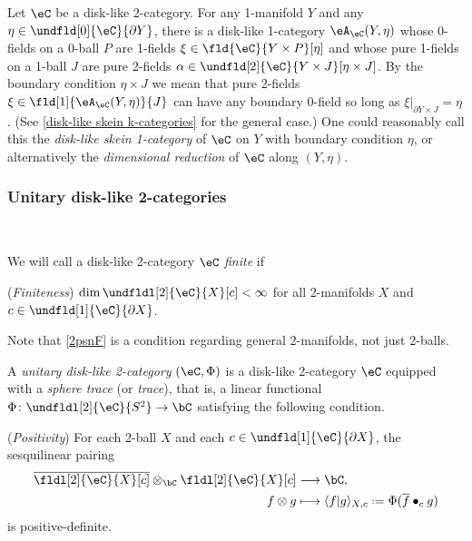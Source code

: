 \documentclass[12pt,reqno]{amsart}
\newcounter{alpha}\renewcommand\thealpha{\upshape\Alph{alpha}}
\newcommand{\psn}{\Phi}
\newcommand{\A}{\eA}
\newcommand{\C}{\eC}
\newcommand{\blt}{\bullet}
\newcommand{\fcj}[1]{\overline{#1}}
\newcommand{\orev}{\overline}
\newcommand{\bkt}[2]{\langle #1|#2 \rangle}
\newcommand{\defn}[1]{\emph{#1}}
\DeclareRobustCommand{\coloneq}{\mathrel{\vcenter{\baselineskip0.5ex\lineskiplimit0pt\hbox{\scriptsize{\upshape.}}\hbox{\scriptsize{\upshape.}}}}=}
\begin{document}
\begin{example}
\label{disk-like skein 1-category}
Let $\C$ be a disk-like 2-category. For any 1-manifold $Y$ and any $\eta\in\undfld[0]{\C}{\partial Y}$, there is a disk-like 1-category $\A_\C(Y,\eta)$ whose 0-fields on a 0-ball $P$ are 1-fields $\xi\in\fld{\C}{Y\times P}[\eta]$ and whose pure 1-fields on a 1-ball $J$ are pure 2-fields $\alpha\in\undfld[2]{\C}{Y\times J}[\eta\times J]$. By the boundary condition $\eta\times J$ we mean that pure 2-fields $\xi\in\fld[1]{\A_\C(Y,\eta)}{J}$ can have any boundary 0-field so long as $\xi|_{\partial Y\times J}=\eta$. (See \cref{disk-like skein k-categories} for the general case.) One could reasonably call this the \defn{disk-like skein 1-category} of $\C$ on $Y$ with boundary condition $\eta$, or alternatively the \defn{dimensional reduction} of $\C$ along $(Y,\eta)$. 
\end{example}

\subsubsection{Unitary disk-like 2-categories}
\label{sec:unitary disk-like 2-categories}

\

\begin{definition}
We will call a disk-like 2-category $\C$ \defn{finite} if
\begin{lst}
    \item[(F)] 
    \label{2psnF}
    (\emph{Finiteness})
    $\dim\undfldl[2]{\C}{X}[c]<\infty$ for all 2-manifolds $X$ and $c\in\undfld[1]{\C}{\partial X}$.
\end{lst}
\end{definition}

Note that \ref{2psnF} is a condition regarding general 2-manifolds, not just 2-balls.

\begin{definition}
  \label{def:unitary disk-like 2-category}
  A \defn{unitary disk-like 2-category} $(\C,\psn)$ is a disk-like 2-category $\C$ equipped with a \defn{sphere trace} (or \defn{trace}), that is, a linear functional $\psn\colon\undfldl[2]{\C}{S^2}\to\bC$ satisfying the following condition.
  \begin{lst}[font=\upshape]
    \item[($\psn$P)]\label{2psnP}
    (\emph{Positivity})
    For each 2-ball $X$ and each $c\in \undfld[1]{\C}{\partial X}$, the sesquilinear pairing
    \begin{equation}
      \begin{aligned}
        \orev{\fldl[2]{\C}{X}[c]}\otimes_{\bC}\fldl[2]{\C}{X}[c] & \longrightarrow \bC,
        \\
        f\otimes g                      & \longmapsto \bkt{f}{g}_{X,c}\coloneq\psn(\fcj f\blt_c g)
      \end{aligned}
    \end{equation}
    is positive-definite.
  \end{lst}
\end{definition}
\end{document}
